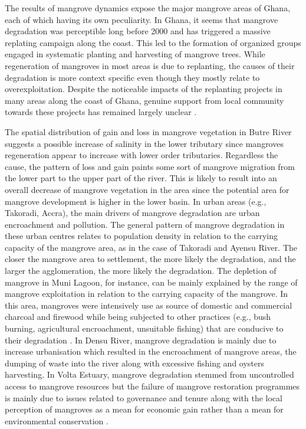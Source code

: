 \documentclass[12pt,oneside,preprint,3p,authoryear,times]{elsarticle} %
\begin{document}
The results of mangrove dynamics expose the major mangrove areas of
Ghana, each of which having its own peculiarity. In Ghana, it seems that
mangrove degradation was perceptible long before 2000 and has triggered
a massive replating campaign along the coast. This led to the formation
of organized groups engaged in systematic planting and harvesting of
mangrove trees. While regeneration of mangroves in most areas is due to
replanting, the causes of their degradation is more context specific
even though they mostly relate to overexploitation. Despite the
noticeable impacts of the replanting projects in many areas along the
coast of Ghana, genuine support from local community towards these
projects has remained largely unclear
\citep{Aheto-et-al-2016, Asante-et-al-2017}.

The spatial distribution of gain and loss in mangrove vegetation in
Butre River suggests a possible increase of salinity in the lower
tributary since mangroves regeneration appear to increase with lower
order tributaries. Regardless the cause, the pattern of loss and gain
paints some sort of mangrove migration from the lower part to the upper
part of the river. This is likely to result into an overall decrease of
mangrove vegetation in the area since the potential area for mangrove
development is higher in the lower basin. In urban areas (e.g.,
Takoradi, Accra), the main drivers of mangrove degradation are urban
encroachment and pollution. The general pattern of mangrove degradation
in these urban centres relates to population density in relation to the
carrying capacity of the mangrove area, as in the case of Takoradi and
Ayensu River. The closer the mangrove area to settlement, the more
likely the degradation, and the larger the agglomeration, the more
likely the degradation. The depletion of mangrove in Muni Lagoon, for
instance, can be mainly explained by the range of mangrove exploitation
in relation to the carrying capacity of the mangrove. In this area,
mangroves were intensively use as source of domestic and commercial
charcoal and firewood while being subjected to other practices (e.g.,
bush burning, agricultural encroachment, unsuitable fishing) that are
conducive to their degradation \citep{A-Rocha-Ghana-2016}. In Densu
River, mangrove degradation is mainly due to increase urbanisation which
resulted in the encroachment of mangrove areas, the dumping of waste
into the river along with excessive fishing and oysters harvesting. In
Volta Estuary, mangrove degradation stemmed from uncontrolled access to
mangrove resources but the failure of mangrove restoration programmes is
mainly due to issues related to governance and tenure along with the
local perception of mangroves as a mean for economic gain rather than a
mean for environmental conservation
\citep{Asante-et-al-2017, Ashiagbor-et-al-2021}.
\end{document}
